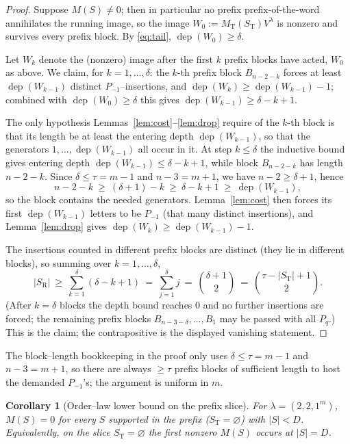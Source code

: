 \documentclass[11pt]{article}
\newtheorem{corollary}[theorem]{Corollary}
\theoremstyle{definition}
\DeclareMathOperator{\dep}{dep}
\newcommand{\Vlam}{V^\lambda}
\newcommand{\Pq}{P_{q}}
\newcommand{\Pm}{P_{-1}}
\newcommand{\St}{S_{\mathrm T}}
\newcommand{\Sr}{S_{\mathrm R}}
\begin{document}
\begin{proof}
Suppose $M(S)\neq0$; then in particular no prefix prefix-of-the-word annihilates the running
image, so the image $W_0:=M_{\mathrm T}(\St)\Vlam$ is nonzero and survives every prefix block.
By \eqref{eq:tail}, $\dep(W_0)\ge\delta$.

Let $W_k$ denote the (nonzero) image after the first $k$ prefix blocks have acted, $W_0$ as
above. We claim, for $k=1,\dots,\delta$: the $k$-th prefix block $B_{n-2-k}$ forces at least
$\dep(W_{k-1})$ distinct $\Pm$--insertions, and $\dep(W_k)\ge\dep(W_{k-1})-1$; combined with
$\dep(W_0)\ge\delta$ this gives $\dep(W_{k-1})\ge\delta-k+1$.

The only hypothesis Lemmas~\ref{lem:cost}--\ref{lem:drop} require of the $k$-th block is that its
length be at least the entering depth $\dep(W_{k-1})$, so that the generators
$1,\dots,\dep(W_{k-1})$ all occur in it. At step $k\le\delta$ the inductive bound gives entering
depth $\dep(W_{k-1})\le\delta-k+1$, while block $B_{n-2-k}$ has length $n-2-k$. Since
$\delta\le\tau=m-1$ and $n-3=m+1$, we have $n-2\ge\delta+1$, hence
\[
   n-2-k\ \ge\ (\delta+1)-k\ \ge\ \delta-k+1\ \ge\ \dep(W_{k-1}),
\]
so the block contains the needed generators. Lemma~\ref{lem:cost} then forces its first
$\dep(W_{k-1})$ letters to be $\Pm$ (that many distinct insertions), and Lemma~\ref{lem:drop}
gives $\dep(W_k)\ge\dep(W_{k-1})-1$.

The insertions counted in different prefix blocks are distinct (they lie in different blocks),
so summing over $k=1,\dots,\delta$,
\[
   |\Sr|\ \ge\ \sum_{k=1}^{\delta}(\delta-k+1)\ =\ \sum_{j=1}^{\delta} j\ =\ \binom{\delta+1}{2}
   \ =\ \binom{\tau-|\St|+1}{2}.
\]
(After $k=\delta$ blocks the depth bound reaches $0$ and no further insertions are forced; the
remaining prefix blocks $B_{n-3-\delta},\dots,B_1$ may be passed with all $\Pq$.) This is the
claim; the contrapositive is the displayed vanishing statement.
\end{proof}

\noindent The block--length bookkeeping in the proof only uses $\delta\le\tau=m-1$ and
$n-3=m+1$, so there are always $\ge\tau$ prefix blocks of sufficient length to host the demanded
$\Pm$'s; the argument is uniform in $m$.

\begin{corollary}[Order--law lower bound on the prefix slice]\label{cor:slice}
For $\lambda=(2,2,1^m)$, $M(S)=0$ for every $S$ supported in the prefix
($\St=\varnothing$) with $|S|<D$. Equivalently, on the slice $\St=\varnothing$ the first nonzero
$M(S)$ occurs at $|S|=D$.
\end{corollary}
\end{document}
